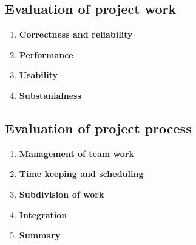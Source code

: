 \subsection{Evaluation of project work}
\label{sub:evaluation_of_project_work}

\begin{enumerate}

	\item \textbf{Correctness and reliability}

	\item \textbf{Performance}

	\item \textbf{Usability}

	\item \textbf{Substanialness}


\end{enumerate}

\subsection{Evaluation of project process}
\label{sub:evaluation_of_project_process}

\begin{enumerate}

	\item \textbf{Management of team work}

	\item \textbf{Time keeping and scheduling}

	\item \textbf{Subdivision of work}

	\item \textbf{Integration}

	\item \textbf{Summary}

\end{enumerate}
